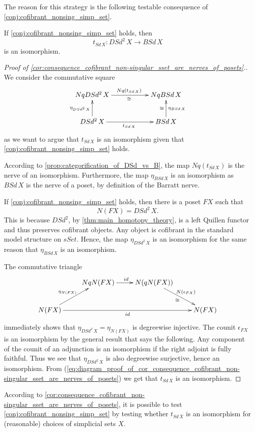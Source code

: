 \noindent The reason for this strategy is the following testable consequence of \cref{conj:cofibrant_nonsing_simp_set}.
\begin{corollary}\label{cor:consequence_cofibrant_non-singular_sset_are_nerves_of_posets}
If \cref{conj:cofibrant_nonsing_simp_set} holds, then
\[t_{Sd\, X}:DSd^2\, X\to BSd\, X\]
is an isomorphism.
\end{corollary}
\begin{proof}[Proof of \cref{cor:consequence_cofibrant_non-singular_sset_are_nerves_of_posets}.]
We consider the commutative square
\begin{equation}
\label{eq:diagram_proof_of_cor_consequence_cofibrant_non-singular_sset_are_nerves_of_posets}
\begin{gathered}
\xymatrix{
NqDSd^2\, X \ar[rr]^{Nq(t_{Sd\, X})}_\cong && NqBSd\, X \\
DSd^2\, X \ar[u]^{\eta _{DSd^2\, X}} \ar[rr]_{t_{Sd\, X}} && BSd\, X \ar[u]_{\eta _{BSd\, X}}^\cong
}
\end{gathered}
\end{equation}
as we want to argue that $t_{Sd\, X}$ is an isomorphism given that \cref{conj:cofibrant_nonsing_simp_set} holds.

According to \cref{prop:categorification_of_DSd_vs_B}, the map $Nq(t_{Sd\, X})$ is the nerve of an isomorphism. Furthermore, the map $\eta _{BSd\, X}$ is an isomorphism as $BSd\, X$ is the nerve of a poset, by definition of the Barratt nerve.

If \cref{conj:cofibrant_nonsing_simp_set} holds, then there is a poset $FX$ such that
\[N(FX)=DSd^2\, X.\]
This is because $DSd^2$, by \cref{thm:main_homotopy_theory}, is a left Quillen functor and thus preserves cofibrant objects. Any object is cofibrant in the standard model structure on $sSet$. Hence, the map $\eta _{DSd^2\, X}$ is an isomorphism for the same reason that $\eta _{BSd\, X}$ is an isomorphism.

The commutative triangle
\begin{displaymath}
\xymatrix{
& NqN(FX) \ar[r]^{id} & N(qN(FX)) \ar[dr]^{N(\epsilon _{FX})}_\cong \\
N(FX) \ar[ur]^{\eta _{N(FX)}} \ar[rrr]_{id} &&& N(FX)
}
\end{displaymath}
immediately shows that $\eta _{DSd^2\, X}=\eta _{N(FX)}$ is degreewise injective. The counit $\epsilon _{FX}$ is an isomorphism by the general result that says the following. Any component of the counit of an adjunction is an isomorphism if the right adjoint is fully faithful. Thus we see that $\eta _{DSd^2\, X}$ is also degreewise surjective, hence an isomorphism. From (\ref{eq:diagram_proof_of_cor_consequence_cofibrant_non-singular_sset_are_nerves_of_posets}) we get that $t_{Sd\, X}$ is an isomorphism.
\end{proof}
\noindent According to \cref{cor:consequence_cofibrant_non-singular_sset_are_nerves_of_posets}, it is possible to test \cref{conj:cofibrant_nonsing_simp_set} by testing whether $t_{Sd\, X}$ is an isomorphism for (reasonable) choices of simplicial sets $X$.

